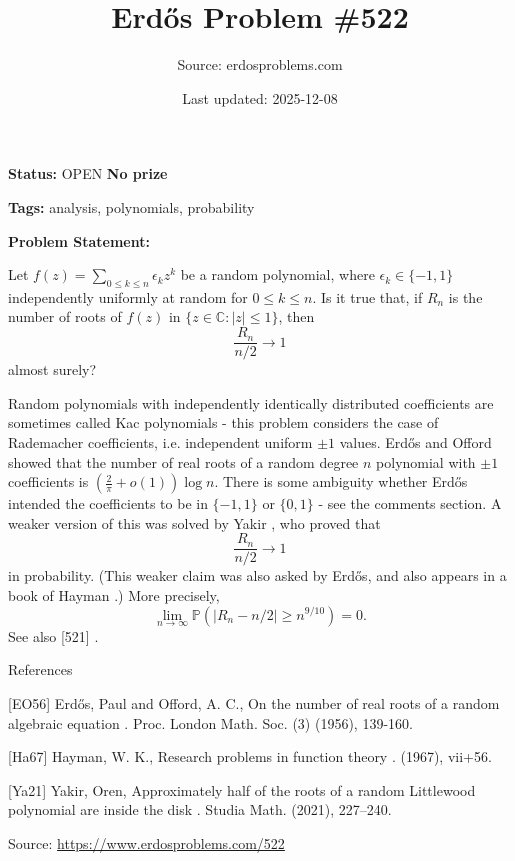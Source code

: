 \documentclass{article}
\title{Erd\H{o}s Problem \#522}
\date{Last updated: 2025-12-08}
\author{Source: erdosproblems.com}
\begin{document}
\maketitle

\noindent\textbf{Status:} OPEN \quad \textbf{No prize}

\noindent\textbf{Tags:} analysis, polynomials, probability

\medskip

\noindent\textbf{Problem Statement:}

Let $f(z)=\sum_{0\leq k\leq n} \epsilon_k z^k$ be a random polynomial, where $\epsilon_k\in \{-1,1\}$ independently uniformly at random for $0\leq k\leq n$. Is it true that, if $R_n$ is the number of roots of $f(z)$ in $\{ z\in \mathbb{C} : \lvert z\rvert \leq 1\}$, then\[\frac{R_n}{n/2}\to 1\]almost surely?




Random polynomials with independently identically distributed coefficients are sometimes called Kac polynomials - this problem considers the case of Rademacher coefficients, i.e. independent uniform $\pm 1$ values. Erd\H{o}s and Offord \cite{EO56} showed that the number of real roots of a random degree $n$ polynomial with $\pm 1$ coefficients is $(\frac{2}{\pi}+o(1))\log n$. There is some ambiguity whether Erd\H{o}s intended the coefficients to be in $\{-1,1\}$ or $\{0,1\}$ - see the comments section. A weaker version of this was solved by Yakir \cite{Ya21}, who proved that\[\frac{R_n}{n/2}\to 1\]in probability. (This weaker claim was also asked by Erd\H{o}s, and also appears in a book of Hayman \cite{Ha67}.) More precisely,\[\lim_{n\to \infty} \mathbb{P}(\lvert R_n-n/2\rvert \geq n^{9/10}) =0.\]See also [521] .




References

[EO56] Erd\H{o}s, Paul and Offord, A. C., On the number of real roots of a random algebraic equation . Proc. London Math. Soc. (3) (1956), 139-160.

[Ha67] Hayman, W. K., Research problems in function theory . (1967), vii+56.

[Ya21] Yakir, Oren, Approximately half of the roots of a random {L}ittlewood polynomial are inside the disk . Studia Math. (2021), 227--240.


\bigskip
\noindent\small{Source: \url{https://www.erdosproblems.com/522}}
\end{document}
